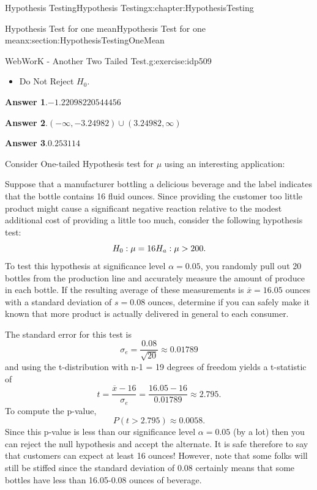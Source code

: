\documentclass[oneside,10pt,]{book}
\newcommand{\blocktitlefont}{\relax}
\numberwithin{equation}{section}
\newcommand{\gt}{>}
\begin{document}
\begin{chapterptx}{Hypothesis Testing}{}{Hypothesis Testing}{}{}{x:chapter:HypothesisTesting}
\begin{sectionptx}{Hypothesis Test for one mean}{}{Hypothesis Test for one mean}{}{}{x:section:HypothesisTestingOneMean}
\begin{inlineexercise}{WebWorK - Another Two Tailed Test.}{g:exercise:idp509}
\begin{itemize}[label=$\odot$,leftmargin=3em,]
\item{}Do Not Reject \(H_0\).%

\end{itemize}
%
\par\smallskip%
\noindent\textbf{\blocktitlefont Answer 1}.\hypertarget{g:answer:idp510}{}\quad{}\(-1.22098220544456\)%
\par\smallskip%
\noindent\textbf{\blocktitlefont Answer 2}.\hypertarget{g:answer:idp511}{}\quad{}\(\left(-\infty ,-3.24982\right)\cup \left(3.24982,\infty \right)\)%
\par\smallskip%
\noindent\textbf{\blocktitlefont Answer 3}.\hypertarget{g:answer:idp512}{}\quad{}\(0.253114\)%
\end{inlineexercise}%
Consider One-tailed Hypothesis test for \(\mu\) using an interesting application:%
\par
Suppose that a manufacturer bottling a delicious beverage and the label indicates that the bottle contains 16 fluid ounces. Since providing the customer too little product might cause a significant negative reaction relative to the modest additional cost of providing a little too much, consider the following hypothesis test:%
\begin{equation*}
H_0 : \mu = 16 \\ H_a: \mu \gt 200.
\end{equation*}
To test this hypothesis at significance level \(\alpha = 0.05\), you randomly pull out 20 bottles from the production line and accurately measure the amount of produce in each bottle. If the resulting average of these measurements is \(\overline{x} = 16.05\) ounces with a standard deviation of \(s = 0.08\) ounces, determine if you can safely make it known that more product is actually delivered in general to each consumer.%
\par
The standard error for this test is%
\begin{equation*}
\sigma_e = \frac{0.08}{\sqrt{20}} \approx 0.01789
\end{equation*}
and using the t-distribution with n-1 = 19 degrees of freedom yields a t-statistic of%
\begin{equation*}
t = \frac{\overline{x} - 16}{\sigma_e} = \frac{16.05-16}{0.01789} \approx 2.795.
\end{equation*}
To compute the p-value,%
\begin{equation*}
P(t \gt 2.795) \approx 0.0058.
\end{equation*}
Since this p-value is less than our significance level \(\alpha = 0.05\) (by a lot) then you can reject the null hypothesis and accept the alternate. It is safe therefore to say that customers can expect at least 16 ounces! However, note that some folks will still be stiffed since the standard deviation of 0.08 certainly means that some bottles have less than 16.05-0.08 ounces of beverage.%

\end{sectionptx}
\end{chapterptx}
\end{document}
